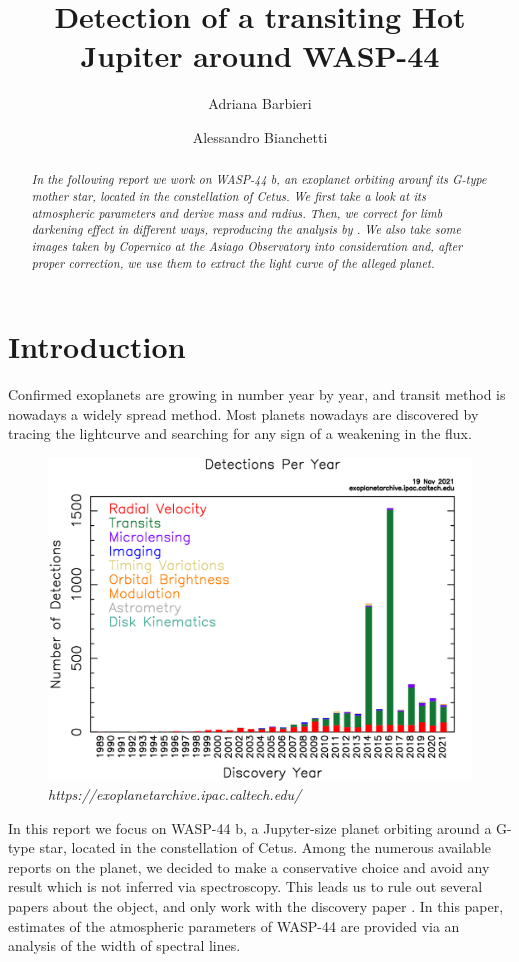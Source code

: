 \documentclass[a4paper,11pt,twocolumn]{article}
\title{Detection of a transiting Hot Jupiter around WASP-44}
\author{Adriana Barbieri \and Alessandro Bianchetti}
\begin{document}
\maketitle

\begin{abstract}

\emph{In the following report we work on WASP-44 b, an exoplanet orbiting 
arounf its G-type mother star, located in the constellation of Cetus. 
We first take a look at its atmospheric parameters and derive mass and 
radius. Then, we correct for limb darkening effect in different ways, 
reproducing the analysis by . We also take some 
images taken by Copernico at the Asiago Observatory into consideration and, 
after proper correction, we use them to extract the light curve of the 
alleged planet.}

\end{abstract}

\section{Introduction}

Confirmed exoplanets are growing in number year by year, and transit method 
is nowadays a widely spread method. Most planets nowadays are discovered 
by tracing the lightcurve and searching for any sign of a weakening in the 
flux.
\begin{figure}[H]
    \centering  
    \includegraphics[scale=0.15, angle=0]{../pictures/exo_dischist.png}
    \caption*{\textit{ https://exoplanetarchive.ipac.caltech.edu/}}
\end{figure}
In this report we focus on WASP-44 b, a Jupyter-size planet orbiting around 
a G-type star, located in the constellation of Cetus.
Among the numerous available reports on the planet, we decided to make a 
conservative choice and avoid any result which is not inferred via 
spectroscopy. This leads us to rule out several papers about the object, and 
only work with the discovery paper \cite*{Anderson}. In this paper, estimates 
of the atmospheric parameters of WASP-44 are provided via an analysis of 
the width of spectral lines.
\end{document}
